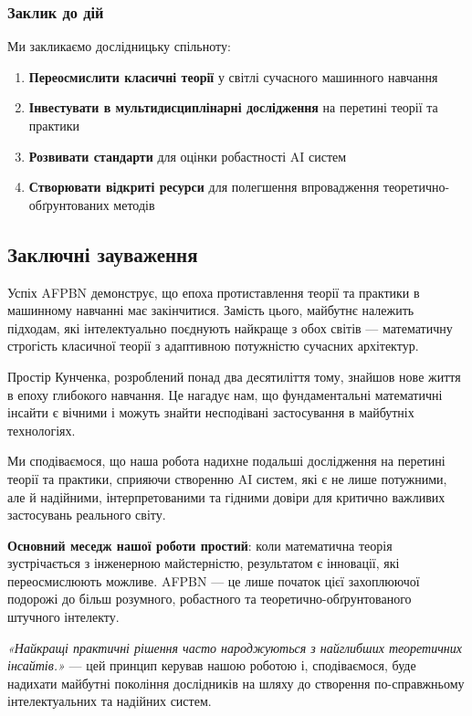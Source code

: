 \documentclass[12pt,a4paper]{article}
\begin{document}
\subsubsection{Заклик до дій}

Ми закликаємо дослідницьку спільноту:
\begin{enumerate}
	\item \textbf{Переосмислити класичні теорії} у світлі сучасного машинного навчання
	\item \textbf{Інвестувати в мультидисциплінарні дослідження} на перетині теорії та практики
	\item \textbf{Розвивати стандарти} для оцінки робастності AI систем
	\item \textbf{Створювати відкриті ресурси} для полегшення впровадження теоретично-обґрунтованих методів
\end{enumerate}

\subsection{Заключні зауваження}

Успіх AFPBN демонструє, що епоха протиставлення теорії та практики в машинному навчанні має закінчитися. Замість цього, майбутнє належить підходам, які інтелектуально поєднують найкраще з обох світів --- математичну строгість класичної теорії з адаптивною потужністю сучасних архітектур.

Простір Кунченка, розроблений понад два десятиліття тому, знайшов нове життя в епоху глибокого навчання. Це нагадує нам, що фундаментальні математичні інсайти є вічними і можуть знайти несподівані застосування в майбутніх технологіях.

Ми сподіваємося, що наша робота надихне подальші дослідження на перетині теорії та практики, сприяючи створенню AI систем, які є не лише потужними, але й надійними, інтерпретованими та гідними довіри для критично важливих застосувань реального світу.

\textbf{Основний меседж нашої роботи простий}: коли математична теорія зустрічається з інженерною майстерністю, результатом є інновації, які переосмислюють можливе. AFPBN --- це лише початок цієї захоплюючої подорожі до більш розумного, робастного та теоретично-обґрунтованого штучного інтелекту.

\vspace{0.5cm}
\noindent \textit{«Найкращі практичні рішення часто народжуються з найглибших теоретичних інсайтів.»} --- цей принцип керував нашою роботою і, сподіваємося, буде надихати майбутні покоління дослідників на шляху до створення по-справжньому інтелектуальних та надійних систем.
	
\end{document}
